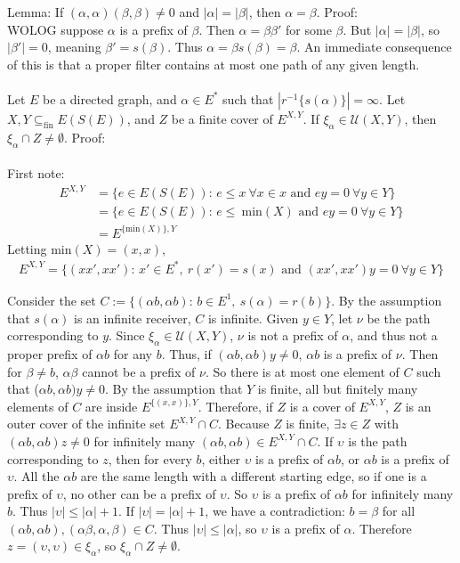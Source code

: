 \documentclass{article}
\begin{document}
Lemma: If $(\alpha, \alpha)(\beta, \beta) \neq 0$ and $|\alpha| = |\beta|$, then $\alpha = \beta$. Proof:
\\
WOLOG suppose $\alpha$ is a prefix of $\beta$. Then $\alpha = \beta \beta'$ for some $\beta$. But
$|\alpha| = |\beta|$, so $|\beta'| = 0$, meaning $\beta' = s(\beta)$. Thus $\alpha = \beta s(\beta) = \beta$.
An immediate consequence of this is that a proper filter contains at most one path of any given length.
\\ \\
Let $E$ be a directed graph, and $\alpha \in E^*$ such that $|r^{-1}\{s(\alpha)\}| = \infty$.
Let $X, Y \subseteq_{\text{fin}} E(S(E))$, and $Z$ be a finite cover of $E^{X, Y}$.
If $\xi_\alpha \in \mathcal{U}(X, Y)$, then $\xi_\alpha \cap Z \neq \emptyset$. Proof:
\\ \\
First note:
\begin{align*}
    E^{X, Y} &= \{ e \in E(S(E))\text{: } e \leq x \ \forall x \in x \text{ and } ey = 0 \ \forall y \in Y \} \\
             &= \{ e \in E(S(E))\text{: } e \leq \ \text{min}(X) \text{ and } ey = 0 \ \forall y \in Y \} \\
             &= E^{\{\text{min}(X)\}, Y}
\end{align*}
Letting min$(X) = (x, x)$,
\begin{align*}
    E^{X, Y} = \{ (xx', xx') \text{: } x' \in E^*, \ r(x') = s(x) \text{ and } (xx', xx')y = 0 \ \forall y \in Y \}
\end{align*}

Consider the set $C := \{ (\alpha b, \alpha b)\text{: } b \in E^1, \ s(\alpha) = r(b) \}$. By the assumption
that $s(\alpha)$ is an infinite receiver, $C$ is infinite. Given $y \in Y$, let $\nu$ be the path corresponding to $y$.
Since $\xi_\alpha \in \mathcal{U}(X, Y)$, $\nu$ is not a prefix of $\alpha$, and thus not a proper prefix of $\alpha b$ 
for any $b$. Thus, if $(\alpha b, \alpha b)y \neq 0$, $\alpha b$ is a prefix of $\nu$. Then for $\beta \neq b$, 
$\alpha \beta$ cannot be a prefix of $\nu$. So there is at most one element of $C$ such that ($\alpha b, \alpha b)y \neq 0$.
By the assumption that $Y$ is finite, all but finitely many elements of $C$ are inside $E^{\{(x, x)\}, Y}$. Therefore, if $Z$
is a cover of $E^{X, Y}$, $Z$ is an outer cover of the infinite set $E^{X, Y} \cap C$. Because $Z$ is finite, $\exists z \in Z$ 
with $(\alpha b, \alpha b)z \neq 0$ for infinitely many $(\alpha b, \alpha b) \in E^{X, Y} \cap C$. If $\upsilon$ is the path corresponding to $z$,
then for every $b$, either $\upsilon$ is a prefix of $\alpha b$, or $\alpha b$ is a prefix of $\upsilon$.
All the $\alpha b$ are the same length with a different starting edge, so if one is a prefix of $\upsilon$,
no other can be a prefix of $\upsilon$. So $\upsilon$ is a prefix of $\alpha b$ for infinitely many $b$. Thus $|\upsilon| \leq |\alpha| + 1$.
If $|\upsilon| = |\alpha| + 1$, we have a contradiction: $b = \beta$ for all $(\alpha b, \alpha b), (\alpha \beta, \alpha, \beta) \in C$.
Thus $|\upsilon| \leq |\alpha|$, so $\upsilon$ is a prefix of $\alpha$. Therefore $z = (\upsilon, \upsilon) \in \xi_\alpha$, so 
$\xi_\alpha \cap Z \neq \emptyset$.
\end{document}
